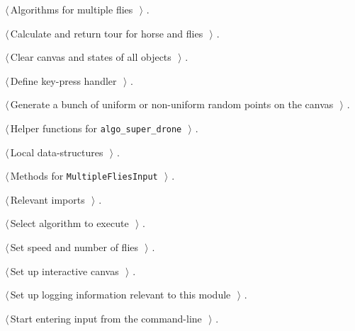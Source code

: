 \documentclass[11.5pt]{report}
\begin{document}
{\small\begin{list}{}{\setlength{\itemsep}{-\parsep}\setlength{\itemindent}{-\leftmargin}}
\item $\langle\,$Algorithms for multiple flies\nobreak\ {\footnotesize {}}$\,\rangle$ {\footnotesize {\NWtxtRefIn} .}
\item $\langle\,$Calculate and return tour for horse and flies\nobreak\ {\footnotesize {}}$\,\rangle$ {\footnotesize {\NWtxtRefIn} .}
\item $\langle\,$Clear canvas and states of all objects\nobreak\ {\footnotesize {}}$\,\rangle$ {\footnotesize {\NWtxtRefIn} .}
\item $\langle\,$Define key-press handler\nobreak\ {\footnotesize {}}$\,\rangle$ {\footnotesize {\NWtxtRefIn} .}
\item $\langle\,$Generate a bunch of uniform or non-uniform random points on the canvas\nobreak\ {\footnotesize {}}$\,\rangle$ {\footnotesize {\NWtxtRefIn} .}
\item $\langle\,$Helper functions for \verb|algo_super_drone|\nobreak\ {\footnotesize {}}$\,\rangle$ {\footnotesize {\NWtxtRefIn} .}
\item $\langle\,$Local data-structures\nobreak\ {\footnotesize {}}$\,\rangle$ {\footnotesize {\NWtxtRefIn} .}
\item $\langle\,$Methods for \verb|MultipleFliesInput|\nobreak\ {\footnotesize {}}$\,\rangle$ {\footnotesize {\NWtxtRefIn} .}
\item $\langle\,$Relevant imports\nobreak\ {\footnotesize {}}$\,\rangle$ {\footnotesize {\NWtxtRefIn} .}
\item $\langle\,$Select algorithm to execute\nobreak\ {\footnotesize {}}$\,\rangle$ {\footnotesize {\NWtxtRefIn} .}
\item $\langle\,$Set speed and number of flies\nobreak\ {\footnotesize {}}$\,\rangle$ {\footnotesize {\NWtxtRefIn} .}
\item $\langle\,$Set up interactive canvas\nobreak\ {\footnotesize {}}$\,\rangle$ {\footnotesize {\NWtxtRefIn} .}
\item $\langle\,$Set up logging information relevant to this module\nobreak\ {\footnotesize {}}$\,\rangle$ {\footnotesize {\NWtxtRefIn} .}
\item $\langle\,$Start entering input from the command-line\nobreak\ {\footnotesize {}}$\,\rangle$ {\footnotesize {\NWtxtRefIn} .}
\end{list}}
\end{document}
